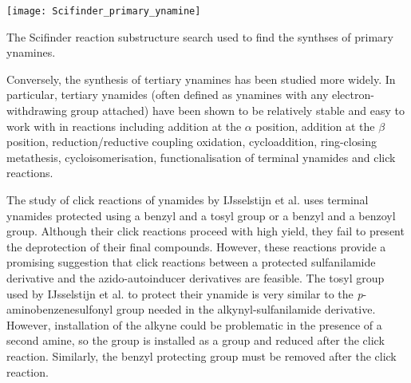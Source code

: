 \begin{scheme}[H]
	\begin{center}
		\texttt{[image: Scifinder\_primary\_ynamine]}
		\caption{The Scifinder reaction substructure search used to find the synthses of primary ynamines\cite{ScifinderPrimaryYnamine}.
		\label{fig:Scifinder_primary_ynamine}}
	\end{center}
\end{scheme}


Conversely, the synthesis of tertiary ynamines has been studied more widely\cite{Ficini1976}. In particular, tertiary ynamides (often defined as ynamines with any electron-withdrawing group attached) have been shown to be relatively stable and easy to work with in reactions including 
addition at the $\alpha$ position, 
addition at the $\beta$ position, 
reduction/reductive coupling
oxidation,
cycloaddition, 
ring-closing metathesis,
cycloisomerisation,
functionalisation of terminal ynamides and click reactions\cite{IJsselstijn2006,Evano2010}. 

The study of click reactions of ynamides by IJsselstijn et al. uses terminal ynamides protected using a benzyl and a tosyl group or a benzyl and a benzoyl group. Although their click reactions proceed with high yield, they fail to present the deprotection of their final compounds. However, these reactions provide a promising suggestion that click reactions between a protected sulfanilamide derivative and the azido-autoinducer derivatives are feasible. The tosyl group used by IJsselstijn et al. to protect their ynamide is very similar to the \textit{p}-aminobenzenesulfonyl group needed in the alkynyl-sulfanilamide derivative. However, installation of the alkyne could be problematic in the presence of a second amine, so the  group is installed as a  group and reduced after the click reaction.  Similarly, the benzyl protecting group must be removed after the click reaction.




